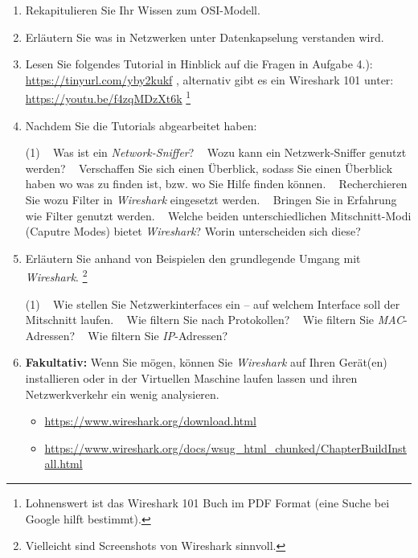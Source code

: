 \documentclass[paper=a4,fontsize=11pt]{scrartcl}%
\numberwithin{equation}{section}
\begin{document}
\begin{enumerate}
	\item Rekapitulieren Sie Ihr Wissen zum OSI-Modell. 
	\item Erläutern Sie was in Netzwerken unter Datenkapselung verstanden wird.	
	\item Lesen Sie folgendes Tutorial in Hinblick auf die Fragen in Aufgabe 4.): \url{https://tinyurl.com/yby2kukf}
	, alternativ gibt es ein Wireshark 101 unter: \url{https://youtu.be/f4zqMDzXt6k} 
	\footnote{Lohnenswert ist das Wireshark 101 Buch im PDF Format (eine Suche bei Google hilft bestimmt).}
	\item Nachdem Sie die Tutorials abgearbeitet haben:
	\begin{tasks}(1)
		\task~ Was ist ein \emph{Network-Sniffer}?
		\task~ Wozu kann ein Netzwerk-Sniffer genutzt werden?
		\task~ Verschaffen Sie sich einen Überblick, sodass Sie einen Überblick haben wo was zu finden ist, bzw. wo Sie Hilfe finden können.
		\task~ Recherchieren Sie wozu Filter in \emph{Wireshark} eingesetzt werden.
		\task~ Bringen Sie in Erfahrung wie Filter genutzt werden.
		\task~ Welche beiden unterschiedlichen Mitschnitt-Modi (Caputre Modes) bietet \emph{Wireshark}? Worin unterscheiden sich diese?
	\end{tasks}
	\item Erläutern Sie anhand von Beispielen den grundlegende Umgang mit \emph{Wireshark}. \footnote{Vielleicht sind Screenshots von Wireshark sinnvoll.}
	\begin{tasks}(1)
		\task~ Wie stellen Sie Netzwerkinterfaces ein -- auf welchem Interface soll der Mitschnitt laufen.
		\task~ Wie filtern Sie nach Protokollen?
		\task~ Wie filtern Sie \emph{MAC}-Adressen?
		\task~ Wie filtern Sie \emph{IP}-Adressen?
	\end{tasks}
	\item \textbf{Fakultativ:} Wenn Sie mögen, können Sie \emph{Wireshark} auf Ihren Gerät(en) installieren oder in der Virtuellen Maschine laufen lassen und ihren Netzwerkverkehr ein wenig analysieren. 
	\begin{itemize}
		\item \url{https://www.wireshark.org/download.html}
		\item \url{https://www.wireshark.org/docs/wsug_html_chunked/ChapterBuildInstall.html}
	\end{itemize}
\end{enumerate}
\end{document}
